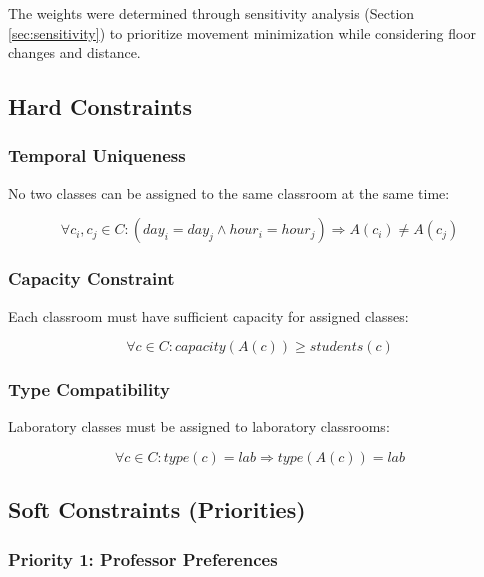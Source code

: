 \documentclass[algorithms,article,submit,pdftex,moreauthors]{Definitions/mdpi}
\begin{document}
The weights were determined through sensitivity analysis (Section \ref{sec:sensitivity}) to prioritize movement minimization while considering floor changes and distance.

\subsection{Hard Constraints}

\subsubsection{Temporal Uniqueness}

No two classes can be assigned to the same classroom at the same time:

\begin{equation}
\forall c_i, c_j \in C: (day_i = day_j \land hour_i = hour_j) \Rightarrow A(c_i) \neq A(c_j)
\end{equation}

\subsubsection{Capacity Constraint}

Each classroom must have sufficient capacity for assigned classes:

\begin{equation}
\forall c \in C: capacity(A(c)) \geq students(c)
\end{equation}

\subsubsection{Type Compatibility}

Laboratory classes must be assigned to laboratory classrooms:

\begin{equation}
\forall c \in C: type(c) = lab \Rightarrow type(A(c)) = lab
\end{equation}

\subsection{Soft Constraints (Priorities)}

\subsubsection{Priority 1: Professor Preferences}
\end{document}
